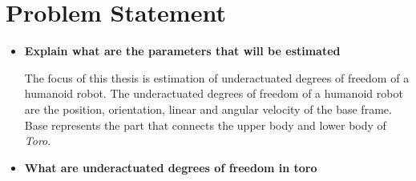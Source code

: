 \section{Problem Statement}
\begin{itemize}
    \item \textbf{Explain what are the parameters that will be estimated}

    The focus of this thesis is estimation of underactuated degrees of freedom of a humanoid robot. The underactuated degrees of freedom of a humanoid robot are the position, orientation, linear and angular velocity of the base frame. Base represents the part that connects the upper body and lower body of \emph{Toro}. 
    \item \textbf{What are underactuated degrees of freedom in toro}


\end{itemize}
